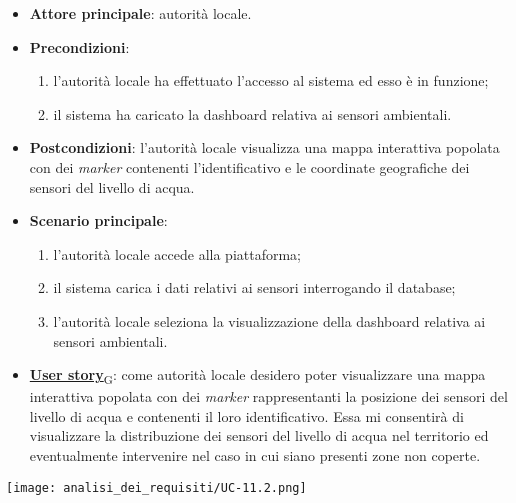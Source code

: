 \begin{itemize}
	\item \textbf{Attore principale}: autorità locale.
	\item \textbf{Precondizioni}:
	      \begin{enumerate}
		      \item l'autorità locale ha effettuato l'accesso al sistema ed esso è in funzione;
		      \item il sistema ha caricato la dashboard relativa ai sensori ambientali.
	      \end{enumerate}
	\item \textbf{Postcondizioni}: l'autorità locale visualizza una mappa interattiva popolata con dei \textit{marker} contenenti l'identificativo e le coordinate geografiche dei sensori del livello di acqua.
	\item \textbf{Scenario principale}:
	      \begin{enumerate}
		      \item l'autorità locale accede alla piattaforma;
		      \item il sistema carica i dati relativi ai sensori interrogando il database;
		      \item l'autorità locale seleziona la visualizzazione della dashboard relativa ai sensori ambientali.
	      \end{enumerate}
	\item \href{https://7last.github.io/docs/rtb/documentazione-interna/glossario\#user-story}{\textbf{User story}\textsubscript{G}}:
	      come autorità locale desidero poter visualizzare una mappa interattiva popolata con dei \textit{marker} rappresentanti la posizione dei sensori del livello di acqua
	      e contenenti il loro identificativo. Essa mi consentirà di visualizzare la distribuzione dei sensori del livello di acqua nel territorio ed eventualmente intervenire nel caso in cui siano presenti zone non coperte.
\end{itemize}
\begin{center}
	\texttt{[image: analisi\_dei\_requisiti/UC-11.2.png]}
\end{center}

